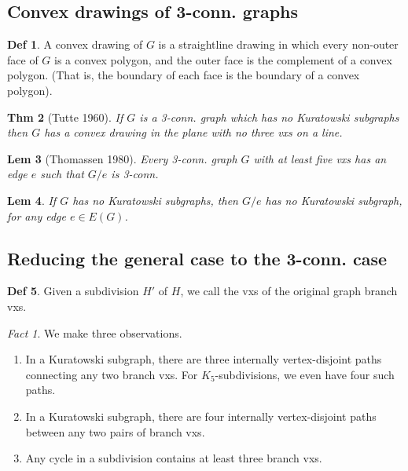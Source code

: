\documentclass[11pt, fleqn, a4paper, landscape]{article}
\theoremstyle{plain} %
\newtheorem{thm}{Thm}
\newtheorem{lem}[thm]{Lem}
\theoremstyle{remark} %
\newtheorem{fact}{Fact}
\theoremstyle{definition} %
\newtheorem{defi}[thm]{Def}
\begin{document}
\begin{multicols}{5}
\subsection{Convex drawings of 3-conn. graphs}

\begin{defi}
A convex drawing of $G$ is a straightline drawing in which every non-outer face of $G$ is a convex polygon, and the outer face is the complement of a convex polygon. (That is, the boundary of each face is the boundary of a convex polygon).
\end{defi}

\begin{thm}[Tutte 1960]
If $G$ is a 3-conn. graph which has no Kuratowski subgraphs then
$G$ has a convex drawing in the plane with no three vxs on a line.
\end{thm}

\begin{lem}[Thomassen 1980]
Every 3-conn. graph $G$ with at least five vxs has an edge
$e$ such that $G\slash e$ is 3-conn.
\end{lem}

\begin{lem}
If $G$ has no Kuratowski subgraphs, then $G\slash e$ has no Kuratowski subgraph, for any edge $e\in E(G)$.
\end{lem}

\subsection{Reducing the general case to the 3-conn. case}

\begin{defi}
Given a subdivision $H'$ of $H$, we call the vxs of the original graph branch vxs.
\end{defi}
\addtocounter{thm}{1}
\begin{fact}
We make three observations. 
\begin{enumerate}
\item  In a Kuratowski subgraph, there are three internally vertex-disjoint paths connecting any two
branch vxs. For $K_5$-subdivisions, we even have four such paths.
\item In a Kuratowski subgraph, there are four internally vertex-disjoint paths between any two pairs
of branch vxs.
\item Any cycle in a subdivision contains at least three branch vxs.
\end{enumerate}
\end{fact}


\end{multicols}
\end{document}
